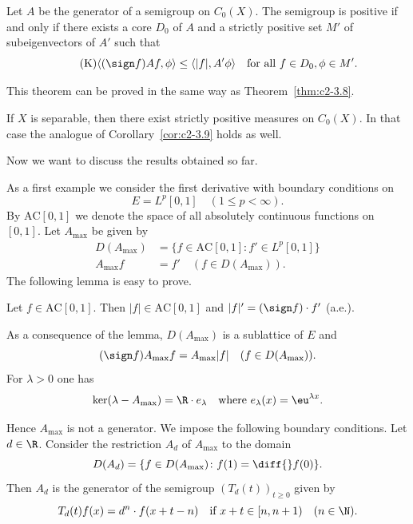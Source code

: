 \begin{theorem}\label{thm:c2-3.13}
Let $A$ be the generator of a semigroup on $C_{0}(X)$.
The semigroup is positive if and only if there exists a core $D_{0}$ of
$A$ and a strictly positive set $M'$ of subeigenvectors of\/ $A'$ such
that
\begin{equation}\label{eq:c2-K7} \tag{K}
\langle(\sign f)Af,\phi \rangle \leq \langle |f|,A'\phi \rangle \quad \text{for all } f \in D_{0}, \phi \in M'.
\end{equation}
\end{theorem}
This theorem can be proved in the same way as Theorem~\ref{thm:c2-3.8}.
\begin{remark*}
If\/ $X$ is separable, then there exist strictly positive
measures on $C_{0}(X)$. 
In that case the analogue of Corollary~\ref{cor:c2-3.9}   holds
as well.
\end{remark*}
Now we want to discuss the results obtained so far.

As a first example we consider the first derivative with boundary
conditions on %
\[
	E = L^{p}[0,1] \quad (1 \leq p < \infty).
\]
%
By $\text{AC}[0,1]$ we denote the space of all absolutely continuous functions on $[0,1]$. 
Let $A_{\max}$ be given by
\begin{align*}
D(A_{\max}) &= \{f \in \text{AC}[0,1] \colon f' \in L^{p}[0,1]\}\\
A_{\max}f &= f' \quad (f \in D(A_{\max})).
\end{align*}
The following lemma is easy to prove.
\begin{lemma}\label{lem:c2-3.14}
Let $f \in \text{AC}[0,1]$. 
Then $|f| \in \text{AC}[0,1]$ and $|f|' = (\sign  f) \cdot f'$ (a.e.).
\end{lemma}
As a consequence of the lemma, $D(A_{\max})$ is a sublattice of\/ $E$ and
\begin{equation}\label{eq:c2-3.7}
(\sign  f)A_{\max}f = A_{\max}|f| \quad (f \in D(A_{\max})).
\end{equation}
For $\lambda > 0$ one has
\begin{equation}\label{eq:c2-3.8}
\text{ker}(\lambda - A_{\max}) = \R \cdot e_{\lambda} \quad \text{where }  e_{\lambda}(x) = \eu^{\lambda x}.
\end{equation}

Hence $A_{\max}$ is not a generator. 
We impose the following boundary conditions.
Let $d \in \R$. 
Consider the restriction $A_{d}$ of\/ $A_{\max}$ to the domain
\begin{equation*}
D(A_{d}) = \{f \in D(A_{\max}) \colon f(1) = \diff{}f(0)\}.
\end{equation*}
Then $A_{d}$ is the generator of the semigroup $(T_{d}(t))_{t \geq 0}$ given by
\begin{equation}\label{eq:c2-3.9}
T_{d}(t)f(x) = d^{n} \cdot f(x+t-n) \quad \text{if } x+t \in [n, n+1) \quad (n \in \N ).
\end{equation}

